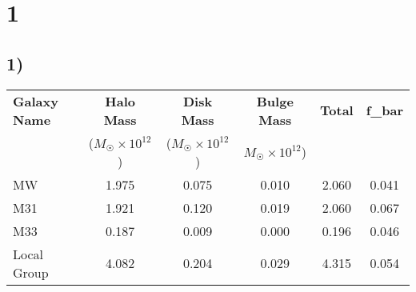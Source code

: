 

\setlength{\parskip}{0.2em}
\setlength{\skip\footins}{20pt}

\newcommand{\hmwkClass}{ASTR 400B}
\newcommand{\hmwkTitle}{Homework 3}
\newcommand{\hmwkDueDate}{Feb 6, 2020}



	
\maketitle

\section*{1}

\subsection*{1) }


\begin{tabular}{lccccc}
	\toprule
	\textbf{Galaxy Name} &  \textbf{Halo Mass}  &  \textbf{Disk Mass} &  \textbf{Bulge Mass} &  \textbf{Total} &  \textbf{f\_bar} \\
	 & ($M_\Sun \times 10^{12}$) & ($M_\Sun \times 10^{12}$) & $M_\Sun \times 10^{12}$) & & \\
	\midrule
	MW &  1.975 &  0.075 &   0.010 &  2.060 &  0.041 \\
	M31 &  1.921 &  0.120 &   0.019 &  2.060 &  0.067 \\
	M33 &  0.187 &  0.009 &   0.000 &  0.196 &  0.046 \\
	\midrule
	Local Group &  4.082 &  0.204 &   0.029 &  4.315 &  0.054 \\
	\bottomrule
\end{tabular}


